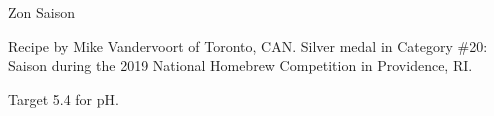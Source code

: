 \begin{recipe}{Zon Saison}

\begin{aboutblock}
Recipe by Mike Vandervoort of Toronto, CAN. Silver medal in Category \#20: Saison
during the 2019 National Homebrew Competition in Providence, RI. \sourceaha
\end{aboutblock}


\begin{methodandtiming}
 
\begin{mashsteps}
\end{mashsteps}

\begin{fermentationsteps}
\end{fermentationsteps}

\begin{directions}
Target 5.4 for pH.
\end{directions}

\end{methodandtiming}

\recipebreak

\begin{ingredientsblock}

\begin{malts}
\end{malts}

\begin{hops}
\end{hops}


\end{ingredientsblock}

\end{recipe}

